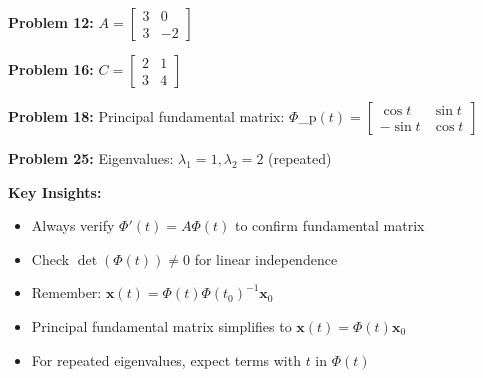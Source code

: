 \documentclass[12pt]{article}
\begin{document}
\textbf{Problem 12:} $A = \begin{bmatrix} 3 & 0 \\ 3 & -2 \end{bmatrix}$

\textbf{Problem 16:} $C = \begin{bmatrix} 2 & 1 \\ 3 & 4 \end{bmatrix}$

\textbf{Problem 18:} Principal fundamental matrix: $\Phi$_{p}$(t) = \begin{bmatrix} \cos t & \sin t \\ -\sin t & \cos t \end{bmatrix}$

\textbf{Problem 25:} Eigenvalues: $\lambda_{1} = 1, \lambda_{2} = 2$ (repeated)

\textbf{Key Insights:}
\begin{itemize}
\item Always verify $\Phi'(t) = A\Phi(t)$ to confirm fundamental matrix
\item Check $\det(\Phi(t)) \neq 0$ for linear independence
\item Remember: $\mathbf{x}(t) = \Phi(t)\Phi(t_{0})^{-1}\mathbf{x}_{0}$
\item Principal fundamental matrix simplifies to $\mathbf{x}(t) = \Phi(t)\mathbf{x}_{0}$
\item For repeated eigenvalues, expect terms with $t$ in $\Phi(t)$
\end{itemize}
\end{document}
